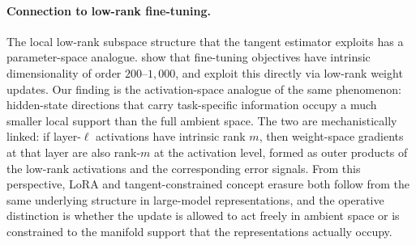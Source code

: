 \paragraph{Connection to low-rank fine-tuning.}
The local low-rank subspace structure that the tangent estimator exploits has a parameter-space analogue. \citet{aghajanyan-etal-2021-intrinsic} show that fine-tuning objectives have intrinsic dimensionality of order $200$--$1{,}000$, and \citet{hu-etal-2022-lora} exploit this directly via low-rank weight updates. Our finding is the activation-space analogue of the same phenomenon: hidden-state directions that carry task-specific information occupy a much smaller local support than the full ambient space. The two are mechanistically linked: if layer-$\ell$ activations have intrinsic rank $m$, then weight-space gradients at that layer are also rank-$m$ at the activation level, formed as outer products of the low-rank activations and the corresponding error signals. From this perspective, LoRA and tangent-constrained concept erasure both follow from the same underlying structure in large-model representations, and the operative distinction is whether the update is allowed to act freely in ambient space or is constrained to the manifold support that the representations actually occupy.
